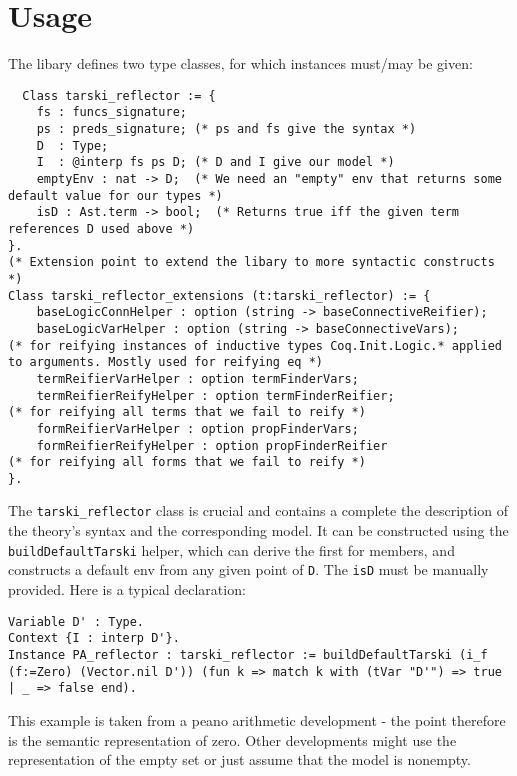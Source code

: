 \documentclass[11pt,a4paper]{article}
\begin{document}
\section{Usage}
The libary defines two type classes, for which instances must/may be given:
\begin{lstlisting}
  Class tarski_reflector := {
	fs : funcs_signature; 
	ps : preds_signature; (* ps and fs give the syntax *)
	D  : Type;
	I  : @interp fs ps D; (* D and I give our model *)
	emptyEnv : nat -> D;  (* We need an "empty" env that returns some default value for our types *)
	isD : Ast.term -> bool;  (* Returns true iff the given term references D used above *)
}. 
(* Extension point to extend the libary to more syntactic constructs *)
Class tarski_reflector_extensions (t:tarski_reflector) := {
	baseLogicConnHelper : option (string -> baseConnectiveReifier); 
	baseLogicVarHelper : option (string -> baseConnectiveVars);                 (* for reifying instances of inductive types Coq.Init.Logic.* applied to arguments. Mostly used for reifying eq *)
	termReifierVarHelper : option termFinderVars;    
	termReifierReifyHelper : option termFinderReifier;                          (* for reifying all terms that we fail to reify *)
	formReifierVarHelper : option propFinderVars;
	formReifierReifyHelper : option propFinderReifier                           (* for reifying all forms that we fail to reify *)
}.
\end{lstlisting}
The \lstinline|tarski_reflector| class is crucial and contains a complete the description of the theory's syntax and the corresponding model. It can be constructed using the \lstinline|buildDefaultTarski| helper, which can derive the first for members, and constructs a default env from any given point of \lstinline|D|. The \lstinline|isD| must be manually provided. Here is a typical declaration:
\begin{lstlisting}
Variable D' : Type.
Context {I : interp D'}.
Instance PA_reflector : tarski_reflector := buildDefaultTarski (i_f (f:=Zero) (Vector.nil D')) (fun k => match k with (tVar "D'") => true | _ => false end).
\end{lstlisting}
This example is taken from a peano arithmetic development - the point therefore is the semantic representation of zero. Other developments might use the representation of the empty set or just assume that the model is nonempty.
\end{document}
